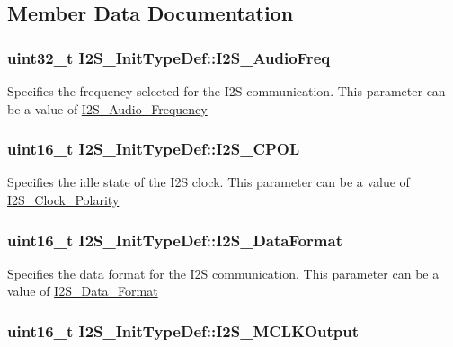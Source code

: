 \subsection{Member Data Documentation}
\hypertarget{structI2S__InitTypeDef_a87674c5fbccad53b7646565f35d1fc0a}{
\subsubsection[{I2S\_\-AudioFreq}]{\setlength{\rightskip}{0pt plus 5cm}uint32\_\-t {\bf I2S\_\-InitTypeDef::I2S\_\-AudioFreq}}}
\label{structI2S__InitTypeDef_a87674c5fbccad53b7646565f35d1fc0a}
Specifies the frequency selected for the I2S communication. This parameter can be a value of \hyperlink{group__I2S__Audio__Frequency}{I2S\_\-Audio\_\-Frequency} \hypertarget{structI2S__InitTypeDef_aeb7741728520734ec2eab95d2143778c}{
\subsubsection[{I2S\_\-CPOL}]{\setlength{\rightskip}{0pt plus 5cm}uint16\_\-t {\bf I2S\_\-InitTypeDef::I2S\_\-CPOL}}}
\label{structI2S__InitTypeDef_aeb7741728520734ec2eab95d2143778c}
Specifies the idle state of the I2S clock. This parameter can be a value of \hyperlink{group__I2S__Clock__Polarity}{I2S\_\-Clock\_\-Polarity} \hypertarget{structI2S__InitTypeDef_ad5e59034081427fd638983c10f18e833}{
\subsubsection[{I2S\_\-DataFormat}]{\setlength{\rightskip}{0pt plus 5cm}uint16\_\-t {\bf I2S\_\-InitTypeDef::I2S\_\-DataFormat}}}
\label{structI2S__InitTypeDef_ad5e59034081427fd638983c10f18e833}
Specifies the data format for the I2S communication. This parameter can be a value of \hyperlink{group__I2S__Data__Format}{I2S\_\-Data\_\-Format} \hypertarget{structI2S__InitTypeDef_ae7aaf79b7f392d79ac2f7b35a24e5d1a}{
\subsubsection[{I2S\_\-MCLKOutput}]{\setlength{\rightskip}{0pt plus 5cm}uint16\_\-t {\bf I2S\_\-InitTypeDef::I2S\_\-MCLKOutput}}}
